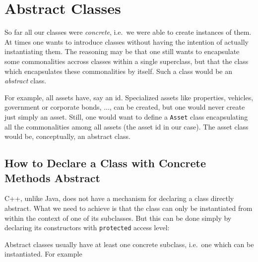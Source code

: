 

\section{Abstract Classes}

So far all our classes were {\em concrete}, i.e.\ we were able to create
instances of them. At times one wants to introduce classes without having 
the intention of actually instantiating them. The reasoning may be 
that one still wants to encapsulate some commonalities accross classes 
within a single superclass, but that the class which encapsulates these
commonalities by itself. Such a class would be an {\em abstract} class.

For example, all assets have, say an id. Specialized assets like properties,
vehicles, government or corporate bonds, ..., can be created, but one
would never create just simply an asset. Still, one would want to define
a \verb+Asset+ class encapsulating all the commonalities among all assets
(the asset id in our case). The asset class would be, conceptually,
an abstract class.


\subsection{How to Declare a Class with Concrete Methods Abstract}

C++, unlike Java, does not have a mechanism for declaring a class directly 
abstract. What we need to achieve is that the class can only be instantiated
from within the context of one of its subclasses. But this can be done
simply by declaring its constructors with \verb+protected+ access level:


Abstract classes usually have at least one concrete subclass, i.e.\ one 
which can be instantiated. For example

  
